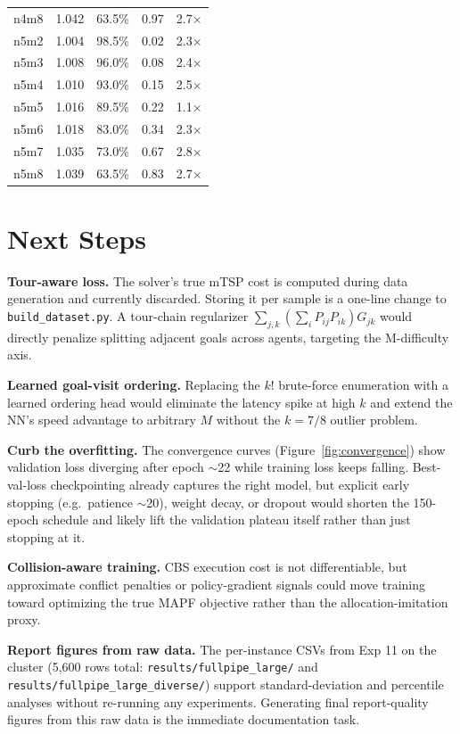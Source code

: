 \documentclass[11pt,a4paper]{article}
\begin{document}
\begin{longtable}{lcccc}
n4m8 & 1.042 & 63.5\% & 0.97 & 2.7$\times$ \\
n5m2 & 1.004 & 98.5\% & 0.02 & 2.3$\times$ \\
n5m3 & 1.008 & 96.0\% & 0.08 & 2.4$\times$ \\
n5m4 & 1.010 & 93.0\% & 0.15 & 2.5$\times$ \\
n5m5 & 1.016 & 89.5\% & 0.22 & 1.1$\times$ \\
n5m6 & 1.018 & 83.0\% & 0.34 & 2.3$\times$ \\
n5m7 & 1.035 & 73.0\% & 0.67 & 2.8$\times$ \\
n5m8 & 1.039 & 63.5\% & 0.83 & 2.7$\times$ \\
\end{longtable}

\clearpage
\section{Next Steps}

\textbf{Tour-aware loss.} The solver's true mTSP cost is computed during data generation and
currently discarded. Storing it per sample is a one-line change to \texttt{build\_dataset.py}.
A tour-chain regularizer $\sum_{j,k}(\sum_i P_{ij}P_{ik})G_{jk}$ would directly penalize
splitting adjacent goals across agents, targeting the M-difficulty axis.

\textbf{Learned goal-visit ordering.} Replacing the $k!$ brute-force enumeration with a learned
ordering head would eliminate the latency spike at high $k$ and extend the NN's speed advantage
to arbitrary $M$ without the $k=7/8$ outlier problem.

\textbf{Curb the overfitting.} The convergence curves (Figure~\ref{fig:convergence}) show
validation loss diverging after epoch $\sim$22 while training loss keeps falling. Best-val-loss
checkpointing already captures the right model, but explicit early stopping (e.g.\ patience
$\sim$20), weight decay, or dropout would shorten the 150-epoch schedule and likely lift the
validation plateau itself rather than just stopping at it.

\textbf{Collision-aware training.} CBS execution cost is not differentiable, but approximate
conflict penalties or policy-gradient signals could move training toward optimizing the true
MAPF objective rather than the allocation-imitation proxy.

\textbf{Report figures from raw data.} The per-instance CSVs from Exp 11 on the cluster (5,600
rows total: \texttt{results/fullpipe\_large/} and \texttt{results/fullpipe\_large\_diverse/})
support standard-deviation and percentile analyses without re-running any experiments.
Generating final report-quality figures from this raw data is the immediate documentation task.
\end{document}

